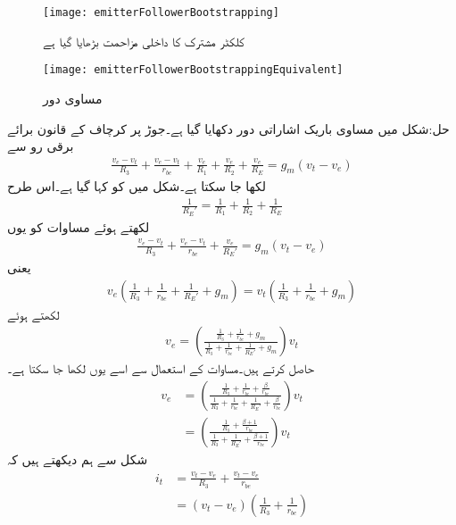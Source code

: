 %
\begin{figure}
\centering
\texttt{[image: emitterFollowerBootstrapping]}
\caption{کلکٹر  مشترک کا داخلی مزاحمت بڑھایا گیا ہے}
\label{شکل_ٹرانزسٹر_کلکٹر _مشترک_زیادہ_داخلی_مزاحمت}
\end{figure}
%
\begin{figure}
\centering
\texttt{[image: emitterFollowerBootstrappingEquivalent]}
\caption{مساوی دور}
\label{شکل_ٹرانزسٹر_کلکٹر _مشترک_زیادہ_داخلی_مزاحمت_مساوی}
\end{figure}

حل:شکل  میں مساوی باریک اشاراتی دور دکھایا گیا ہے۔جوڑ  پر کرچاف کے قانون برائے برقی رو سے
\begin{align}\label{مساوات_ٹرانزسٹر_بوٹسٹریپ_الف}
\frac{v_e-v_t}{R_3}+\frac{v_e-v_t}{r_{be}}+\frac{v_e}{R_1}+\frac{v_e}{R_2}+\frac{v_e}{R_E}=g_m \left(v_t-v_e \right)
\end{align}
لکھا جا سکتا ہے۔شکل میں  کو  کہا گیا ہے۔اس طرح
\begin{align*}
\frac{1}{R_E'}=\frac{1}{R_1}+\frac{1}{R_2}+\frac{1}{R_E}
\end{align*}
لکھتے ہوئے مساوات  کو یوں
 \begin{align*}
\frac{v_e-v_t}{R_3}+\frac{v_e-v_t}{r_{be}}+\frac{v_e}{R_E'}=g_m \left(v_t-v_e \right)
\end{align*}
یعنی
 \begin{align*}
v_e \left(\frac{1}{R_3}+\frac{1}{r_{be}} +\frac{1}{R_E'}+g_m\right)=v_t \left(\frac{1}{R_3}+\frac{1}{r_{be}}+g_m \right)
\end{align*}
لکھتے ہوئے
\begin{align*}
v_e=\left(\frac{\frac{1}{R_3}+\frac{1}{r_{be}}+g_m}{\frac{1}{R_3}+\frac{1}{r_{be}} +\frac{1}{R_E'}+g_m}\right) v_t
\end{align*}
حاصل کرتے ہیں۔مساوات  کے استعمال سے اسے یوں لکھا جا سکتا ہے۔
\begin{align*}
v_e&=\left(\frac{\frac{1}{R_3}+\frac{1}{r_{be}}+\frac{\beta}{r_{be}}}{\frac{1}{R_3}+\frac{1}{r_{be}} +\frac{1}{R_E'}+\frac{\beta}{r_{be}}}\right) v_t\\
&=\left(\frac{\frac{1}{R_3}+\frac{\beta+1}{r_{be}}}{\frac{1}{R_3} +\frac{1}{R_E'}+\frac{\beta+1}{r_{be}}}\right) v_t
\end{align*}
شکل سے ہم دیکھتے ہیں کہ 
\begin{align*}
i_t&=\frac{v_t-v_e}{R_3}+\frac{v_t-v_e}{r_{be}}\\
&=\left(v_t-v_e \right) \left(\frac{1}{R_3}+\frac{1}{r_{be}} \right)
\end{align*}
